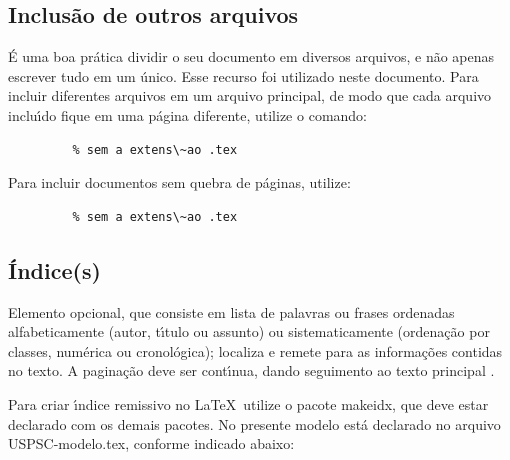 \subsection{Inclus\~ao de outros arquivos}\label{sec-include}

\'E uma boa pr\'atica dividir o seu documento em diversos arquivos, e n\~ao
apenas escrever tudo em um \'unico. Esse recurso foi utilizado neste
documento. Para incluir diferentes arquivos em um arquivo principal,
de modo que cada arquivo inclu\'{\i}do fique em uma p\'agina diferente, utilize o
comando:

\begin{verbatim}
         % sem a extens\~ao .tex
\end{verbatim}

Para incluir documentos sem quebra de p\'aginas, utilize:

\begin{verbatim}
         % sem a extens\~ao .tex
\end{verbatim}
\subsection{\'Indice(s)}
Elemento  opcional,  que  consiste  em  lista  de  palavras  ou  frases  ordenadas alfabeticamente (autor, t\'{\i}tulo ou assunto) ou sistematicamente (ordena\c{c}\~ao por classes, num\'erica ou cronol\'ogica); localiza e remete para as informa\c{c}\~oes contidas no texto. A pagina\c{c}\~ao deve ser cont\'{\i}nua, dando seguimento ao texto principal \cite{aguia2020}.

Para criar \'{\i}ndice remissivo no \LaTeX\  utilize o pacote makeidx, que deve estar declarado com os demais pacotes. No presente modelo est\'a declarado no arquivo USPSC-modelo.tex, conforme indicado abaixo:

